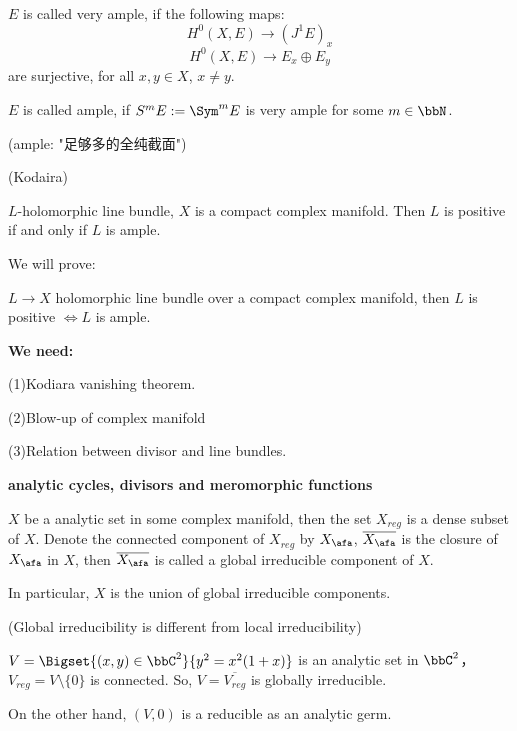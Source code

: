 \begin{definition}
$E$ is called very ample, if the following maps:
$$H^0(X,E)\to (J^1E)_x$$
$$H^0(X,E)\to E_x\oplus E_y$$
are surjective, for all $x,y\in X$, $x\neq y$.

$E$ is called ample, if $S^mE:=\Sym^m E$ is very ample for some $m\in\bbN$.
\end{definition}

(ample: "足够多的全纯截面")

\begin{thm}(Kodaira)

$L$-holomorphic line bundle, $X$ is a compact complex manifold.
Then $L$ is positive if and only if $L$ is ample.
\end{thm}


We will prove:

\begin{thm}
$L\to X$ holomorphic line bundle over a compact complex manifold,
then $L$ is positive $\iff L$ is ample. 
\end{thm}

\textbf{We need:}

(1)Kodiara vanishing theorem.

(2)Blow-up of complex manifold

(3)Relation between divisor and line bundles.

\textbf{analytic cycles, divisors and meromorphic functions}

\begin{definition}
$X$ be a analytic set in some complex manifold, then the set 
$X_{reg}$ is a dense subset of $X$.
Denote the connected component of $X_{reg}$ by $X_\afa$,
$\overline{X_\afa}$ is the closure of $X_\afa$ in $X$, 
then $\overline{X_\afa}$ is called a global irreducible component of $X$.

In particular, $X$ is the union of global irreducible components.
\end{definition}

\begin{example}(Global irreducibility is different from local irreducibility)

$V=\Bigset{(x,y)\in\bbC^2}{y^2=x^2(1+x)}$ is an analytic set in $\bbC^2$，
$V_{reg}=V\setminus\{0\}$ is connected. So, 
$V=\overline{V_{reg}}$ is globally irreducible.

On the other hand, $(V,0)$ is a reducible as an analytic germ.
\end{example}

